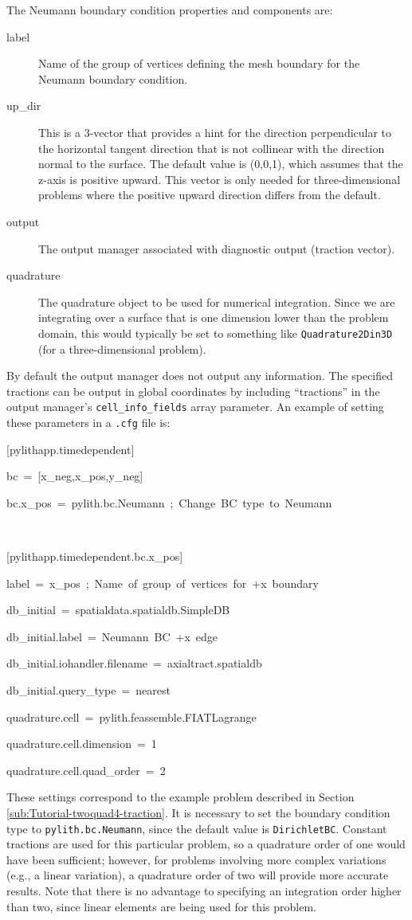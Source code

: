 The Neumann boundary condition properties and components are:
\begin{description}
\item [{label}] Name of the group of vertices defining the mesh boundary
for the Neumann boundary condition.
\item [{up\_dir}] This is a 3-vector that provides a hint for the direction
perpendicular to the horizontal tangent direction that is not collinear
with the direction normal to the surface. The default value is (0,0,1),
which assumes that the z-axis is positive upward. This vector is only
needed for three-dimensional problems where the positive upward direction
differs from the default.
\item [{output}] The output manager associated with diagnostic output (traction
vector).
\item [{quadrature}] The quadrature object to be used for numerical integration.
Since we are integrating over a surface that is one dimension lower
than the problem domain, this would typically be set to something
like \texttt{Quadrature2Din3D} (for a three-dimensional problem).
\end{description}
By default the output manager does not output any information. The
specified tractions can be output in global coordinates by including
``tractions'' in the output manager's \texttt{cell\_info\_fields}
array parameter. An example of setting these parameters in a \texttt{.cfg}
file is:
\begin{lyxcode}
{[}pylithapp.timedependent{]}

bc~=~{[}x\_neg,x\_pos,y\_neg{]}

bc.x\_pos~=~pylith.bc.Neumann~;~Change~BC~type~to~Neumann

~

{[}pylithapp.timedependent.bc.x\_pos{]}

label~=~x\_pos~;~Name~of~group~of~vertices~for~+x~boundary

db\_initial~=~spatialdata.spatialdb.SimpleDB

db\_initial.label~=~Neumann~BC~+x~edge

db\_initial.iohandler.filename~=~axialtract.spatialdb

db\_initial.query\_type~=~nearest

quadrature.cell~=~pylith.feassemble.FIATLagrange

quadrature.cell.dimension~=~1

quadrature.cell.quad\_order~=~2
\end{lyxcode}
These settings correspond to the example problem described in Section
\ref{sub:Tutorial-twoquad4-traction}. It is necessary to set the
boundary condition type to \texttt{pylith.bc.Neumann}, since the default
value is \texttt{DirichletBC}. Constant tractions are used for this
particular problem, so a quadrature order of one would have been sufficient;
however, for problems involving more complex variations (e.g., a linear
variation), a quadrature order of two will provide more accurate results.
Note that there is no advantage to specifying an integration order
higher than two, since linear elements are being used for this problem.

